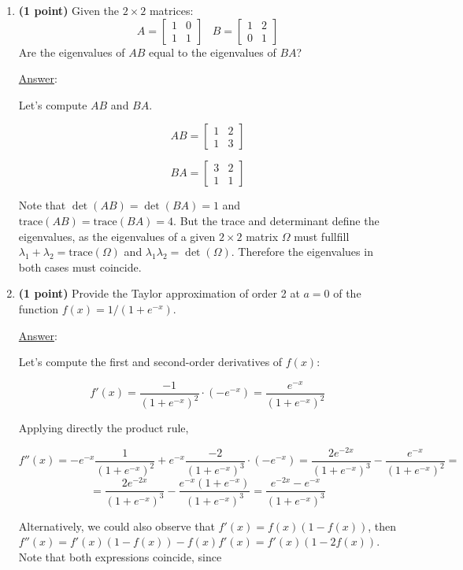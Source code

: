 \documentclass[]{book}
\theoremstyle{definition}
\newcommand\ans{\underline{Answer}: }
\begin{document}
\begin{enumerate}
\begin{itemize}
\end{itemize}



\item {\bf (1 point)} Given the $2\times 2$ matrices:
\[
A = \begin{bmatrix}
1 & 0 \\
1 & 1
\end{bmatrix}\;\;\;
B = \begin{bmatrix}
1 & 2 \\
0 & 1
\end{bmatrix}
\]
Are the eigenvalues of $AB$ equal to the eigenvalues of $BA$?

\ans

Let's compute $AB$ and $BA$.

\[
AB = {\begin{bmatrix}
  1 & 2 \\
  1 & 3 
  \end{bmatrix}
}
\]

\[
BA = {\begin{bmatrix}
  3 & 2 \\
  1 & 1 
  \end{bmatrix}
}
\]

Note that $\det(AB) = \det(BA) = 1$ and $\textrm{trace}(AB) = \textrm{trace}(BA) = 4$. But the trace and determinant define the eigenvalues, as the eigenvalues of a given $2\times 2$ matrix $\Omega$ must fullfill $\lambda_1 + \lambda_2 = \textrm{trace}(\Omega)$ and $\lambda_1 \lambda_2 = \det(\Omega)$. Therefore the eigenvalues in both cases must coincide.


\item {\bf (1 point)} Provide the Taylor approximation of order 2 at $a=0$ of the function $f(x) = 1 / (1 + e^{-x})$.

\ans

Let's compute the first and second-order derivatives of $f(x)$:

\[
f'(x) = \frac{-1}{(1 + e^{-x})^2} \cdot (-e^{-x}) = \frac{e^{-x}}{(1+e^{-x})^2}
\]

Applying directly the product rule,

\[
f''(x) = -e^{-x} \frac{1}{(1+e^{-x})^2} + e^{-x} \frac{-2}{(1+e^{-x})^3} \cdot (-e^{-x}) = 
\frac{2e^{-2x}}{(1 + e^{-x})^3} - \frac{e^{-x}}{(1+e^{-x})^2} = 
\]
\[
= \frac{2e^{-2x}}{(1 + e^{-x})^3} - \frac{e^{-x} (1+e^{-x})}{(1+e^{-x})^3} = \frac{e^{-2x} - e^{-x}}{(1+e^{-x})^3}
\]

Alternatively, we could also observe that $f'(x) = f(x)(1 - f(x))$, then $f''(x) = f'(x)(1-f(x)) - f(x)f'(x) = f'(x) (1 - 2f(x))$. Note that both expressions coincide, since


\end{enumerate}
\end{document}
